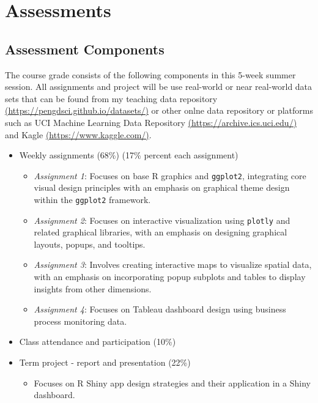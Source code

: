 \documentclass[
]{article}
\providecommand{\tightlist}{%
  \setlength{\itemsep}{0pt}\setlength{\parskip}{0pt}}
\begin{document}
\hypertarget{assessments}{%
\section{Assessments}\label{assessments}}

\hypertarget{assessment-components}{%
\subsection{Assessment Components}\label{assessment-components}}

The course grade consists of the following components in this 5-week
summer session. All assignments and project will be use real-world or
near real-world data sets that can be found from my teaching data
repository
\href{https://pengdsci.github.io/datasets/}{(https://pengdsci.github.io/datasets/)}
or other onlne data repository or platforms such as UCI Machine Learning
Data Repository
\href{https://archive.ics.uci.edu/}{(https://archive.ics.uci.edu/)} and
Kagle \href{https://www.kaggle.com/}{(https://www.kaggle.com/)}.

\begin{itemize}
\tightlist
\item
  Weekly assignments (68\%) (17\% percent each assignment)

  \begin{itemize}
  \tightlist
  \item
    \emph{Assignment 1}: Focuses on base R graphics and
    \texttt{ggplot2}, integrating core visual design principles with an
    emphasis on graphical theme design within the \texttt{ggplot2}
    framework.
  \item
    \emph{Assignment 2}: Focuses on interactive visualization using
    \texttt{plotly} and related graphical libraries, with an emphasis on
    designing graphical layouts, popups, and tooltips.
  \item
    \emph{Assignment 3}: Involves creating interactive maps to visualize
    spatial data, with an emphasis on incorporating popup subplots and
    tables to display insights from other dimensions.
  \item
    \emph{Assignment 4}: Focuses on Tableau dashboard design using
    business process monitoring data.
  \end{itemize}
\item
  Class attendance and participation (10\%)
\item
  Term project - report and presentation (22\%)

  \begin{itemize}
  \tightlist
  \item
    Focuses on R Shiny app design strategies and their application in a
    Shiny dashboard.
  \end{itemize}
\end{itemize}
\end{document}
